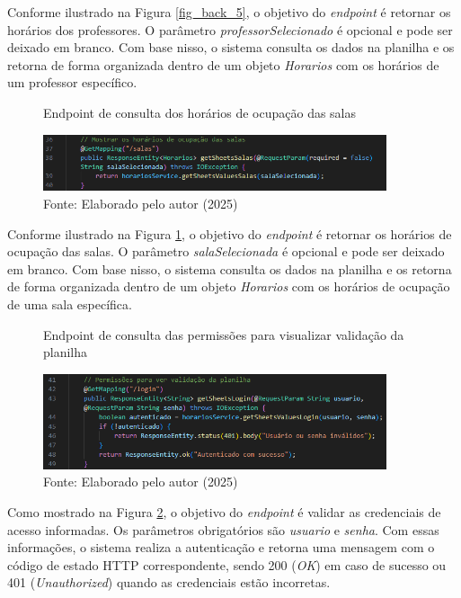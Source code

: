 \begin{itemize}
    Conforme ilustrado na Figura \ref{fig_back_5}, o objetivo do \textit{endpoint} é retornar os horários dos professores. O parâmetro \textit{professorSelecionado} é opcional e pode ser deixado em branco. Com base nisso, o sistema consulta os dados na planilha e os retorna de forma organizada dentro de um objeto \textit{Horarios} com os horários de um professor específico.

    \begin{figure}[htb]
        \centering
        \caption{Endpoint de consulta dos horários de ocupação das salas}
        \includegraphics[width=0.9\textwidth]{Figuras/back-6.png}
        \caption*{Fonte: Elaborado pelo autor (2025)}
        \label{fig_back_6}
    \end{figure}

    Conforme ilustrado na Figura \ref{fig_back_6}, o objetivo do \textit{endpoint} é retornar os horários de ocupação das salas. O parâmetro \textit{salaSelecionada} é opcional e pode ser deixado em branco. Com base nisso, o sistema consulta os dados na planilha e os retorna de forma organizada dentro de um objeto \textit{Horarios} com os horários de ocupação de uma sala específica.

    \begin{figure}[H]
        \centering
        \caption{Endpoint de consulta das permissões para visualizar validação da planilha}
        \includegraphics[width=0.9\textwidth]{Figuras/back-7.png}
        \caption*{Fonte: Elaborado pelo autor (2025)}
        \label{fig_back_7}
    \end{figure}

    Como mostrado na Figura \ref{fig_back_7}, o objetivo do \textit{endpoint} é validar as credenciais de acesso informadas. Os parâmetros obrigatórios são \textit{usuario} e \textit{senha}. Com essas informações, o sistema realiza a autenticação e retorna uma mensagem com o código de estado HTTP correspondente, sendo 200 (\textit{OK}) em caso de sucesso ou 401 (\textit{Unauthorized}) quando as credenciais estão incorretas.


\end{itemize}

